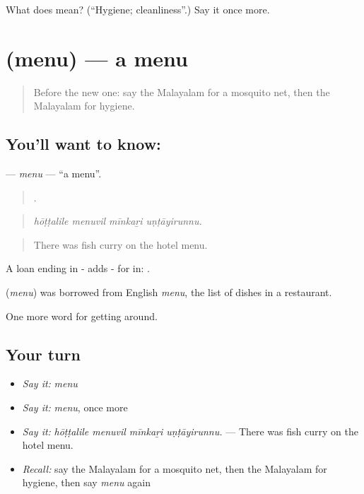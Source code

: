 \begin{tcolorbox}[breakable,colback=teal!4,colframe=teal!35!black,title={Before you move on}]
What does  mean? (\textquotedblleft{}Hygiene; cleanliness\textquotedblright{}.) Say it once more.
\end{tcolorbox}
\section[\texorpdfstring{\ml{മെനു} (menu)}{മെനു (menu)}]{ (menu) — a menu}

\label{lesson:ML-C483-menu}



\begin{quote}
Before the new one: say the Malayalam for a mosquito net, then the Malayalam for hygiene.
\end{quote}

\subsection*{You'll want to know: }
\textbf{} — \emph{menu} — \textquotedblleft{}a menu\textquotedblright{}.

\begin{quote}
   .
\end{quote}

\begin{quote}
\emph{hōṭṭalile menuvil mīnkaṟi uṇṭāyirunnu.}
\end{quote}

\begin{quote}
There was fish curry on the hotel menu.
\end{quote}

A loan ending in - adds - for in: .

\begin{cousinweb}
\textbf{} (\emph{menu}) was borrowed from English \emph{menu}, the list of dishes in a restaurant.
\end{cousinweb}

\begin{grammarlens}[title={What you've built}]
One more word for getting around.
\end{grammarlens}

\subsection*{Your turn}
\begin{itemize}
\raggedright
  \item \emph{Say it:} \emph{menu}
  \item \emph{Say it:} \emph{menu}, once more
  \item \emph{Say it:} \emph{hōṭṭalile menuvil mīnkaṟi uṇṭāyirunnu.} — There was fish curry on the hotel menu.
  \item \emph{Recall:} say the Malayalam for a mosquito net, then the Malayalam for hygiene, then say \emph{menu} again
\end{itemize}

